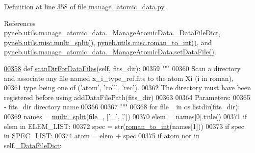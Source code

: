 Definition at line \hyperlink{manage__atomic__data_8py_source_l00358}{358} of file \hyperlink{manage__atomic__data_8py_source}{manage\+\_\+atomic\+\_\+data.\+py}.



References \hyperlink{manage__atomic__data_8py_source_l00078}{pyneb.\+utils.\+manage\+\_\+atomic\+\_\+data.\+\_\+\+Manage\+Atomic\+Data.\+\_\+\+Data\+File\+Dict}, \hyperlink{misc_8py_source_l00187}{pyneb.\+utils.\+misc.\+multi\+\_\+split()}, \hyperlink{misc_8py_source_l00053}{pyneb.\+utils.\+misc.\+roman\+\_\+to\+\_\+int()}, and \hyperlink{manage__atomic__data_8py_source_l00380}{pyneb.\+utils.\+manage\+\_\+atomic\+\_\+data.\+\_\+\+Manage\+Atomic\+Data.\+set\+Data\+File()}.


\begin{DoxyCode}
\hypertarget{classpyneb_1_1utils_1_1manage__atomic__data_1_1___manage_atomic_data_l00358}{}\hyperlink{classpyneb_1_1utils_1_1manage__atomic__data_1_1___manage_atomic_data_af9b8c445d7b585983c8b5221aad5402f}{00358}     \textcolor{keyword}{def }\hyperlink{classpyneb_1_1utils_1_1manage__atomic__data_1_1___manage_atomic_data_af9b8c445d7b585983c8b5221aad5402f}{scanDirForDataFiles}(self, fits\_dir):
00359         \textcolor{stringliteral}{"""}
00360 \textcolor{stringliteral}{        Scan a directory and associate any file named x\_i\_type\_ref.fits to the atom Xi (i in roman), }
00361 \textcolor{stringliteral}{        type being one of ('atom', 'coll', 'rec').}
00362 \textcolor{stringliteral}{        The directory must have been registered before using addDataFilePath(fits\_dir)}
00363 \textcolor{stringliteral}{}
00364 \textcolor{stringliteral}{        Parameters:}
00365 \textcolor{stringliteral}{            - fits\_dir        directory name}
00366 \textcolor{stringliteral}{}
00367 \textcolor{stringliteral}{        """}
00368         \textcolor{keywordflow}{for} file\_ \textcolor{keywordflow}{in} os.listdir(fits\_dir):
00369             names = \hyperlink{namespacepyneb_1_1utils_1_1misc_a4fc4f061f0c41f29de52ec765f894faf}{multi\_split}(file\_, [\textcolor{stringliteral}{'\_'}, \textcolor{stringliteral}{'.'}])
00370             elem = names[0].title()            
00371             \textcolor{keywordflow}{if} elem \textcolor{keywordflow}{in} ELEM\_LIST:
00372                 spec = str(\hyperlink{namespacepyneb_1_1utils_1_1misc_a97329c3ce57bd870421672b90e3e6541}{roman\_to\_int}(names[1]))
00373                 \textcolor{keywordflow}{if} spec \textcolor{keywordflow}{in} SPEC\_LIST:
00374                     atom = elem + spec
00375                     \textcolor{keywordflow}{if} atom \textcolor{keywordflow}{not} \textcolor{keywordflow}{in} self.\hyperlink{classpyneb_1_1utils_1_1manage__atomic__data_1_1___manage_atomic_data_a25a8e0770b6d8a375cfc9092d600684d}{\_DataFileDict}:

\end{DoxyCode}
